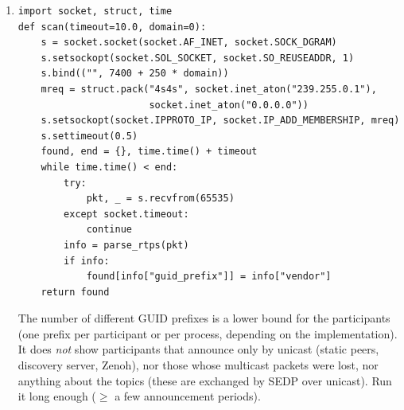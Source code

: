 \begin{enumerate}[label=\textbf{\ansnum.\arabic*}]
  \item[\textbf{\ansnum.10}]
\begin{verbatim}
import socket, struct, time
def scan(timeout=10.0, domain=0):
    s = socket.socket(socket.AF_INET, socket.SOCK_DGRAM)
    s.setsockopt(socket.SOL_SOCKET, socket.SO_REUSEADDR, 1)
    s.bind(("", 7400 + 250 * domain))
    mreq = struct.pack("4s4s", socket.inet_aton("239.255.0.1"),
                       socket.inet_aton("0.0.0.0"))
    s.setsockopt(socket.IPPROTO_IP, socket.IP_ADD_MEMBERSHIP, mreq)
    s.settimeout(0.5)
    found, end = {}, time.time() + timeout
    while time.time() < end:
        try:
            pkt, _ = s.recvfrom(65535)
        except socket.timeout:
            continue
        info = parse_rtps(pkt)
        if info:
            found[info["guid_prefix"]] = info["vendor"]
    return found
\end{verbatim}
  The number of different GUID prefixes is a lower bound for the participants (one prefix per participant or per process, depending on the implementation). It does \emph{not} show participants that announce only by unicast (static peers, discovery server, Zenoh), nor those whose multicast packets were lost, nor anything about the topics (these are exchanged by SEDP over unicast). Run it long enough ($\ge$ a few announcement periods).
\end{enumerate}
